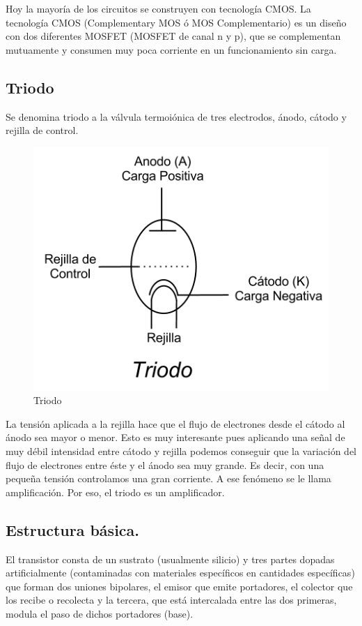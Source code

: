 \documentclass{article}
\begin{document}
Hoy la mayoría de los circuitos se construyen con tecnología CMOS. La
tecnología CMOS (Complementary MOS ó MOS Complementario) es un diseño
con dos diferentes MOSFET (MOSFET de canal n y p), que se complementan
mutuamente y consumen muy poca corriente en un funcionamiento sin carga.

\subsection{Triodo}\label{triodo}

Se denomina triodo a la válvula termoiónica de tres electrodos, ánodo,
cátodo y rejilla de control.

\begin{figure}[htbp]
\centering
\includegraphics[scale=0.4]{images/triodo.png}
\caption{Triodo}
\end{figure}

La tensión aplicada a la rejilla hace que el flujo de electrones desde
el cátodo al ánodo sea mayor o menor. Esto es muy interesante pues
aplicando una señal de muy débil intensidad entre cátodo y rejilla
podemos conseguir que la variación del flujo de electrones entre éste y
el ánodo sea muy grande. Es decir, con una pequeña tensión controlamos
una gran corriente. A ese fenómeno se le llama amplificación. Por eso,
el triodo es un amplificador.

\subsection{Estructura básica.}\label{estructura-buxe1sica.}

El transistor consta de un sustrato (usualmente silicio) y tres partes
dopadas artificialmente (contaminadas con materiales específicos en
cantidades específicas) que forman dos uniones bipolares, el emisor que
emite portadores, el colector que los recibe o recolecta y la tercera,
que está intercalada entre las dos primeras, modula el paso de dichos
portadores (base).
\end{document}
